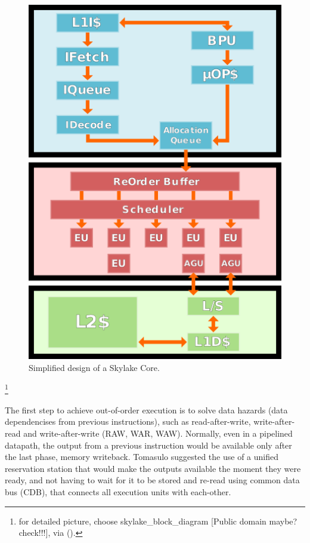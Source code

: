 \documentclass[sigconf]{acmart}
\begin{document}
\begin{figure}[h]
  \centering
  \includegraphics[width=\linewidth]{skylake_simple_diagram}
  \caption{Simplified design of a Skylake Core.}  
\end{figure}

\footnote{ for detailed picture, choose skylake\_block\_diagram [Public domain maybe? check!!!], via (). }

The first step to achieve out-of-order execution is to solve data hazards (data dependencises from previous instructions), such as read-after-write, write-after-read and write-after-write (RAW, WAR, WAW). Normally, even in a pipelined datapath, the output from a previous instruction would be available only after the last phase, memory writeback. Tomasulo \cite{Cohen07} suggested the use of a unified reservation station that would make the outputs available the moment they were ready, and not having to wait for it to be stored and re-read using common data bus (CDB), that connects all execution units with each-other. 
\end{document}
